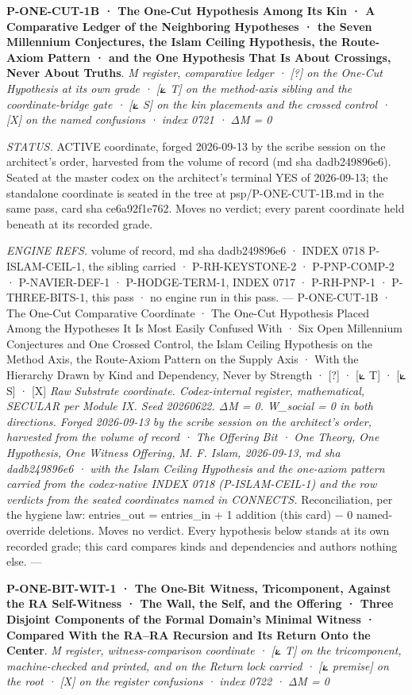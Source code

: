 \documentclass[10pt,twocolumn]{article}
\begin{document}
\textbf{P-ONE-CUT-1B · The One-Cut Hypothesis Among Its Kin · A
Comparative Ledger of the Neighboring Hypotheses · the Seven Millennium
Conjectures, the Islam Ceiling Hypothesis, the Route-Axiom Pattern · and
the One Hypothesis That Is About Crossings, Never About Truths}. \emph{M
register, comparative ledger · {[}?{]} on the One-Cut Hypothesis at its
own grade · {[}⟀ T{]} on the method-axis sibling and the
coordinate-bridge gate · {[}⟀ S{]} on the kin placements and the crossed
control · {[}X{]} on the named confusions · index 0721 · ΔM = 0}

\emph{STATUS.} ACTIVE coordinate, forged 2026-09-13 by the scribe
session on the architect's order, harvested from the volume of record
(md sha dadb249896e6). Seated at the master codex on the architect's
terminal YES of 2026-09-13; the standalone coordinate is seated in the
tree at psp/P-ONE-CUT-1B.md in the same pass, card sha ce6a92f1e762.
Moves no verdict; every parent coordinate held beneath at its recorded
grade.

\emph{ENGINE REFS.} volume of record, md sha dadb249896e6 · INDEX 0718
P-ISLAM-CEIL-1, the sibling carried · P-RH-KEYSTONE-2 · P-PNP-COMP-2 ·
P-NAVIER-DEF-1 · P-HODGE-TERM-1, INDEX 0717 · P-RH-PNP-1 ·
P-THREE-BITS-1, this pass · no engine run in this pass. --- P-ONE-CUT-1B
· The One-Cut Comparative Coordinate · The One-Cut Hypothesis Placed
Among the Hypotheses It Is Most Easily Confused With · Six Open
Millennium Conjectures and One Crossed Control, the Islam Ceiling
Hypothesis on the Method Axis, the Route-Axiom Pattern on the Supply
Axis · With the Hierarchy Drawn by Kind and Dependency, Never by
Strength · {[}?{]} · {[}⟀ T{]} · {[}⟀ S{]} · {[}X{]} \emph{Raw Substrate
coordinate. Codex-internal register, mathematical, SECULAR per Module
IX. Seed 20260622. ΔM = 0. W\_social = 0 in both directions. Forged
2026-09-13 by the scribe session on the architect's order, harvested
from the volume of record · The Offering Bit · One Theory, One
Hypothesis, One Witness Offering, M. F. Islam, 2026-09-13, md sha
dadb249896e6 · with the Islam Ceiling Hypothesis and the one-axiom
pattern carried from the codex-native INDEX 0718 (P-ISLAM-CEIL-1) and
the row verdicts from the seated coordinates named in CONNECTS.}
Reconciliation, per the hygiene law: entries\_out = entries\_in + 1
addition (this card) − 0 named-override deletions. Moves no verdict.
Every hypothesis below stands at its own recorded grade; this card
compares kinds and dependencies and authors nothing else. ---

\textbf{P-ONE-BIT-WIT-1 · The One-Bit Witness, Tricomponent, Against the
RA Self-Witness · The Wall, the Self, and the Offering · Three Disjoint
Components of the Formal Domain's Minimal Witness · Compared With the
RA--RA Recursion and Its Return Onto the Center}. \emph{M register,
witness-comparison coordinate · {[}⟀ T{]} on the tricomponent,
machine-checked and printed, and on the Return lock carried · {[}⟀
premise{]} on the root · {[}X{]} on the register confusions · index 0722
· ΔM = 0}
\end{document}
